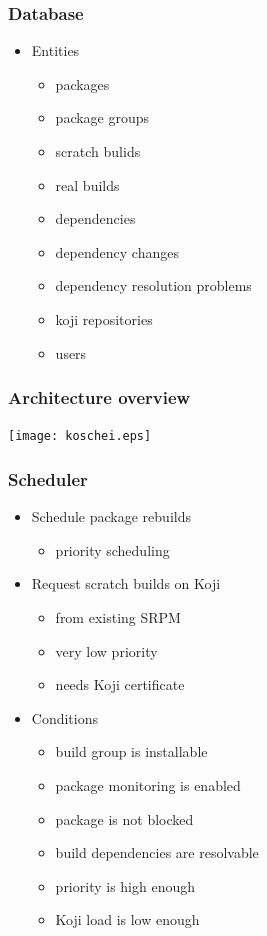 \documentclass[pdftex,unicode,xcolor=table]{beamer}
\begin{document}
\begin{frame}
  \frametitle{Database}
  \begin{itemize}
    \item Entities
    \begin{itemize}
      \item packages
      \item package groups
      \item scratch bulids
      \item real builds
      \item dependencies
      \item dependency changes
      \item dependency resolution problems
      \item koji repositories
      \item users
    \end{itemize}
  \end{itemize}
\end{frame}

\begin{frame}[fragile]
  \frametitle{Architecture overview}
  \begin{center}
    \texttt{[image: koschei.eps]}
  \end{center}
\end{frame}

\begin{frame}
  \frametitle{Scheduler}
  \begin{itemize}
    \item Schedule package rebuilds
    \begin{itemize}
      \item priority scheduling
    \end{itemize}
    \item Request scratch builds on Koji
    \begin{itemize}
      \item from existing SRPM
      \item very low priority
      \item needs Koji certificate
    \end{itemize}
    \item Conditions
    \begin{itemize}
      \item build group is installable
      \item package monitoring is enabled
      \item package is not blocked
      \item build dependencies are resolvable
      \item priority is high enough
      \item Koji load is low enough
    \end{itemize}
  \end{itemize}
\end{frame}
\end{document}
